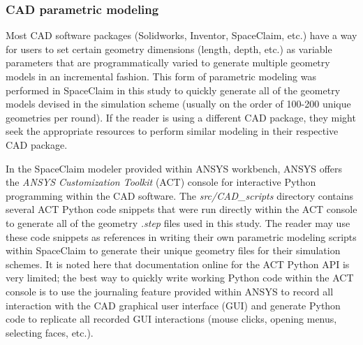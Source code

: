 \documentclass[11pt,letterpaper]{article}
\begin{document}
			\subsubsection{CAD parametric modeling}
			Most CAD software packages (Solidworks, Inventor, SpaceClaim, etc.) have a way for users to set certain geometry dimensions (length, depth, etc.) as variable parameters that are programmatically varied to generate multiple geometry models in an incremental fashion. This form of parametric modeling was performed in SpaceClaim in this study to quickly generate all of the geometry models devised in the simulation scheme (usually on the order of 100-200 unique geometries per round). If the reader is using a different CAD package, they might seek the appropriate resources to perform similar modeling in their respective CAD package. \bigskip
			
			In the SpaceClaim modeler provided within ANSYS workbench, ANSYS offers the \textit{ANSYS Customization Toolkit} (ACT) console for interactive Python programming within the CAD software. The \textit{src/CAD\_scripts} directory contains several ACT Python code snippets that were run directly within the ACT console to generate all of the geometry \textit{.step} files used in this study. The reader may use these code snippets as references in writing their own parametric modeling scripts within SpaceClaim to generate their unique geometry files for their simulation schemes. It is noted here that documentation online for the ACT Python API is very limited; the best way to quickly write working Python code within the ACT console is to use the journaling feature provided within ANSYS to record all interaction with the CAD graphical user interface (GUI) and generate Python code to replicate all recorded GUI interactions (mouse clicks, opening menus, selecting faces, etc.). \bigskip
			
\end{document}
